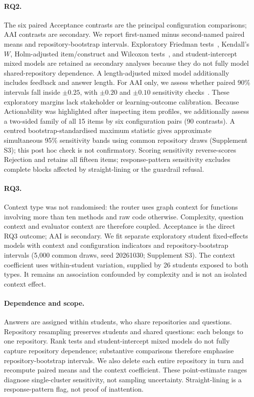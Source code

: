 \documentclass[runningheads]{llncs}
\begin{document}
\paragraph{RQ2.} The six paired Acceptance contrasts are the principal configuration comparisons; AAI contrasts are secondary. We report first-named minus second-named paired means and repository-bootstrap intervals. Exploratory Friedman tests~\cite{friedman1937use}, Kendall's $W$, Holm-adjusted item/construct and Wilcoxon tests~\cite{holm1979simple}, and student-intercept mixed models are retained as secondary analyses because they do not fully model shared-repository dependence. A length-adjusted mixed model additionally includes feedback and answer length. For AAI only, we assess whether paired 90\% intervals fall inside $\pm0.25$, with $\pm0.20$ and $\pm0.10$ sensitivity checks~\cite{lakens2017equivalence}. These exploratory margins lack stakeholder or learning-outcome calibration. Because Actionability was highlighted after inspecting item profiles, we additionally assess a two-sided family of all 15 items by six configuration pairs (90 contrasts). A centred bootstrap-standardised maximum statistic gives approximate simultaneous 95\% sensitivity bands using common repository draws (Supplement S3); this post hoc check is not confirmatory. Scoring sensitivity reverse-scores Rejection and retains all fifteen items; response-pattern sensitivity excludes complete blocks affected by straight-lining or the guardrail refusal.

\paragraph{RQ3.} Context type was not randomised: the router uses graph context for functions involving more than ten methods and raw code otherwise. Complexity, question context and evaluator context are therefore coupled. Acceptance is the direct RQ3 outcome; AAI is secondary. We fit separate exploratory student fixed-effects models with context and configuration indicators and repository-bootstrap intervals (5,000 common draws, seed 20261030; Supplement S3). The context coefficient uses within-student variation, supplied by 26 students exposed to both types. It remains an association confounded by complexity and is not an isolated context effect.

\paragraph{Dependence and scope.} Answers are assigned within students, who share repositories and questions. Repository resampling preserves students and shared questions: each belongs to one repository. Rank tests and student-intercept mixed models do not fully capture repository dependence; substantive comparisons therefore emphasise repository-bootstrap intervals. We also delete each entire repository in turn and recompute paired means and the context coefficient. These point-estimate ranges diagnose single-cluster sensitivity, not sampling uncertainty. Straight-lining is a response-pattern flag, not proof of inattention.
\end{document}
